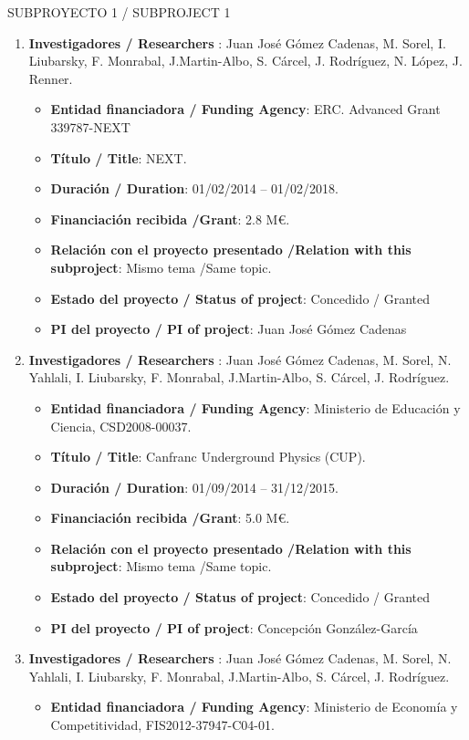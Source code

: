 {\sc SUBPROYECTO 1 / SUBPROJECT 1}

\begin{enumerate}
\item {\bf Investigadores / Researchers }: Juan José Gómez Cadenas, M. Sorel, I. Liubarsky, F. Monrabal, J.Martin-Albo, S. Cárcel, J. Rodríguez, N. López, J. Renner.
\begin{itemize}
\item {\bf Entidad financiadora / Funding Agency}: ERC. Advanced Grant 339787-NEXT 
\item {\bf Título / Title}:  NEXT.
\item {\bf Duración / Duration}: 01/02/2014 -- 01/02/2018. 
\item {\bf Financiación recibida /Grant}: 2.8 M\euro. 
\item {\bf Relación con el proyecto presentado /Relation with this subproject}: Mismo tema /Same topic. 
\item {\bf Estado del proyecto / Status of project}: Concedido / Granted
\item {\bf PI del proyecto / PI of project}: Juan José Gómez Cadenas
\end{itemize}
\item {\bf Investigadores / Researchers }: Juan José Gómez Cadenas, M. Sorel, N. Yahlali, I. Liubarsky, F. Monrabal, J.Martin-Albo, S. Cárcel, J. Rodríguez.
\begin{itemize}
\item {\bf Entidad financiadora / Funding Agency}: Ministerio de Educaci\'on y Ciencia, CSD2008-00037.
\item {\bf Título / Title}:  Canfranc Underground Physics (CUP).
\item {\bf Duración / Duration}: 01/09/2014 -- 31/12/2015. 
\item {\bf Financiación recibida /Grant}: 5.0 M\euro. 
\item {\bf Relación con el proyecto presentado /Relation with this subproject}: Mismo tema /Same topic. 
\item {\bf Estado del proyecto / Status of project}: Concedido / Granted
\item {\bf PI del proyecto / PI of project}: Concepción González-García 
\end{itemize}
\item {\bf Investigadores / Researchers }: Juan José Gómez Cadenas, M. Sorel, N. Yahlali, I. Liubarsky, F. Monrabal, J.Martin-Albo, S. Cárcel, J. Rodríguez.
\begin{itemize}
\item {\bf Entidad financiadora / Funding Agency}:  Ministerio de Econom\'ia y Competitividad, FIS2012-37947-C04-01.

\end{itemize}
\end{enumerate}
